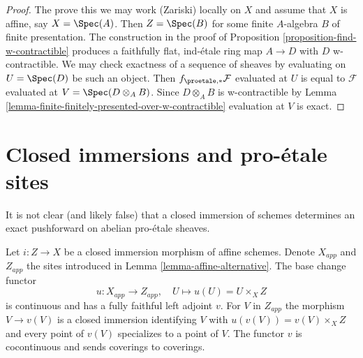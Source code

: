 \begin{proof}
The prove this we may work (Zariski) locally on $X$ and assume that $X$
is affine, say $X = \Spec(A)$. Then $Z = \Spec(B)$ for some finite
$A$-algebra $B$ of finite presentation. The construction in the proof of
Proposition \ref{proposition-find-w-contractible}
produces a faithfully flat, ind-\'etale ring map $A \to D$
with $D$ w-contractible. We may check exactness of a sequence of
sheaves by evaluating on $U = \Spec(D)$ be such an object. Then
$f_{\proetale, *}\mathcal{F}$
evaluated at $U$ is equal to $\mathcal{F}$ evaluated at
$V = \Spec(D \otimes_A B)$. Since $D \otimes_A B$ is w-contractible
by Lemma \ref{lemma-finite-finitely-presented-over-w-contractible}
evaluation at $V$ is exact.
\end{proof}








\section{Closed immersions and pro-\'etale sites}
\label{section-closed-immersion}

\noindent
It is not clear (and likely false) that a closed immersion of schemes
determines an exact pushforward on abelian pro-\'etale sheaves.

\begin{lemma}
\label{lemma-closed-immersion-affines}
Let $i : Z \to X$ be a closed immersion morphism of affine schemes.
Denote $X_{app}$ and $Z_{app}$ the sites introduced in
Lemma \ref{lemma-affine-alternative}.
The base change functor
$$
u : X_{app} \to Z_{app},\quad U \longmapsto u(U) = U \times_X Z
$$
is continuous and has a fully faithful left adjoint $v$.
For $V$ in $Z_{app}$ the morphism $V \to v(V)$ is a closed immersion
identifying $V$ with $u(v(V)) = v(V) \times_X Z$ and every point of
$v(V)$ specializes to a point of $V$.
The functor $v$ is cocontinuous and sends coverings to coverings.
\end{lemma}

